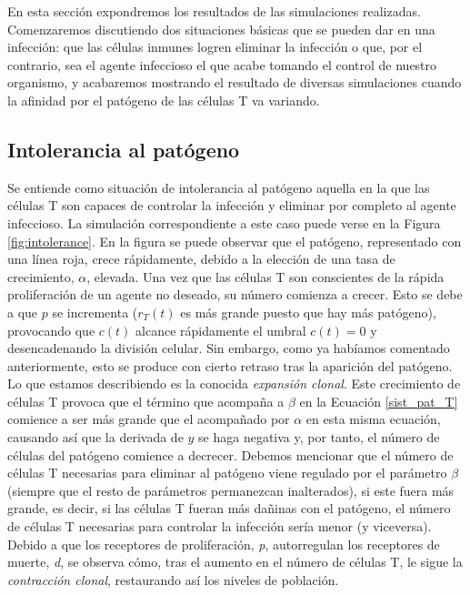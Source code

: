 En esta sección expondremos los resultados de las simulaciones realizadas. Comenzaremos discutiendo dos situaciones básicas que se pueden dar en una infección: que las células inmunes logren eliminar la infección o que, por el contrario, sea el agente infeccioso el que acabe tomando el control de nuestro organismo, y acabaremos mostrando el resultado de diversas simulaciones cuando la afinidad por el patógeno de las células T va variando.

\subsection{Intolerancia al patógeno}
\label{sim:intoler}

Se entiende como situación de intolerancia al patógeno aquella en la que las células T son capaces de controlar la infección y eliminar por completo al agente infeccioso. La simulación correspondiente a este caso puede verse en la Figura \ref{fig:intolerance}. En la figura se puede observar que el patógeno, representado con una línea roja, crece rápidamente, debido a la elección de una tasa de crecimiento, $\alpha$, elevada. Una vez que las células T son conscientes de la rápida proliferación de un agente no deseado, su número comienza a crecer. Esto se debe a que $p$ se incrementa ($r_{T}(t)$ es más grande puesto que hay más patógeno), provocando que $c(t)$ alcance rápidamente el umbral $c(t) = 0$ y desencadenando la división celular. Sin embargo, como ya habíamos comentado anteriormente, esto se produce con cierto retraso tras la aparición del patógeno. Lo que estamos describiendo es la conocida \textit{expansión clonal}. Este crecimiento de células T provoca que el término que acompaña a $\beta$ en la Ecuación \ref{sist_pat_T} comience a ser más grande que el acompañado por $\alpha$ en esta misma ecuación, causando así que la derivada de $y$ se haga negativa y, por tanto, el número de células del patógeno comience a decrecer. Debemos mencionar que el número de células T necesarias para eliminar al patógeno viene regulado por el parámetro $\beta$ (siempre que el resto de parámetros permanezcan inalterados), si este fuera más grande, es decir, si las células T fueran más dañinas con el patógeno, el número de células T necesarias para controlar la infección sería menor (y viceversa). Debido a que los receptores de proliferación, \textit{p}, autorregulan los receptores de muerte, \textit{d}, se observa cómo, tras el aumento en el número de células T, le sigue la \textit{contracción clonal}, restaurando así los niveles de población.

